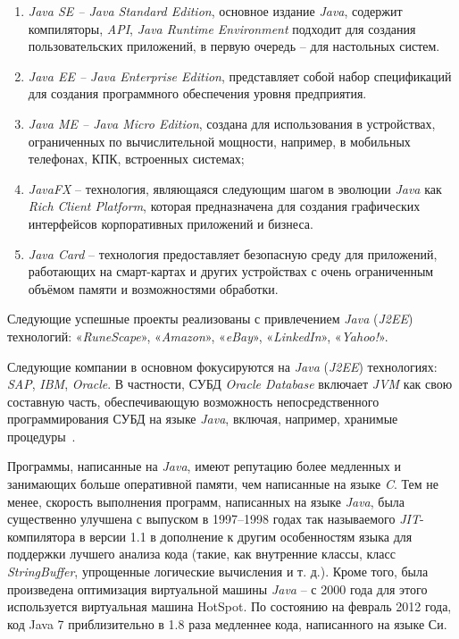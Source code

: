 \begin{enumerate}
	\item \textit{Java SE – Java Standard Edition}, основное издание \textit{Java}, содержит компиляторы, \textit{API}, \textit{Java Runtime Environment} подходит для создания пользовательских приложений, в первую очередь – для настольных систем.
	\item \textit{Java EE – Java Enterprise Edition}, представляет собой набор спецификаций для создания программного обеспечения уровня предприятия.
	\item \textit{Java ME – Java Micro Edition}, создана для использования в устройствах, ограниченных по вычислительной мощности, например, в мобильных телефонах, КПК, встроенных системах;
	\item \textit{JavaFX} – технология, являющаяся следующим шагом в эволюции \textit{Java} как \textit{Rich Client Platform}, которая предназначена для создания графических интерфейсов корпоративных приложений и бизнеса.
	\item \textit{Java Card} – технология предоставляет безопасную среду для приложений, работающих на смарт-картах и других устройствах с очень ограниченным объёмом памяти и возможностями обработки.
\end{enumerate}

Следующие успешные проекты реализованы с привлечением \textit{Java} (\textit{J2EE}) технологий: «\textit{RuneScape}», «\textit{Amazon}», «\textit{eBay}», «\textit{LinkedIn}», «\textit{Yahoo!}».

Следующие компании в основном фокусируются на \textit{Java} (\textit{J2EE}) технологиях: \textit{SAP}, \textit{IBM}, \textit{Oracle}. В частности, СУБД \textit{Oracle Database} включает \textit{JVM} как свою составную часть, обеспечивающую возможность непосредственного программирования СУБД на языке \textit{Java}, включая, например, хранимые процедуры~\cite{java}.

Программы, написанные на \textit{Java}, имеют репутацию более медленных и занимающих больше оперативной памяти, чем написанные на языке \textit{C}. Тем не менее, скорость выполнения программ, написанных на языке \textit{Java}, была существенно улучшена с выпуском в 1997–1998 годах так называемого \textit{JIT}-компилятора в версии 1.1 в дополнение к другим особенностям языка для поддержки лучшего анализа кода (такие, как внутренние классы, класс \textit{StringBuffer}, упрощенные логические вычисления и т. д.). Кроме того, была произведена оптимизация виртуальной машины \textit{Java} – с 2000 года для этого используется виртуальная машина HotSpot. По состоянию на февраль 2012 года, код Java 7 приблизительно в 1.8 раза медленнее кода, написанного на языке Си.


